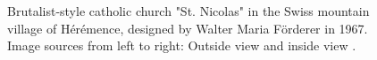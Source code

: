 \documentclass{article}
\begin{document}
\begin{figure}
    \centering
    \caption{Brutalist-style catholic church "St. Nicolas" in the Swiss mountain village of Hérémence, designed by Walter Maria Förderer in 1967. Image sources from left to right: Outside view \cite{bissegger_eglise_2018-1} and inside view \cite{bissegger_eglise_2018}.}
    \label{fig:kunstformen}
\end{figure}

\newpage
\end{document}
